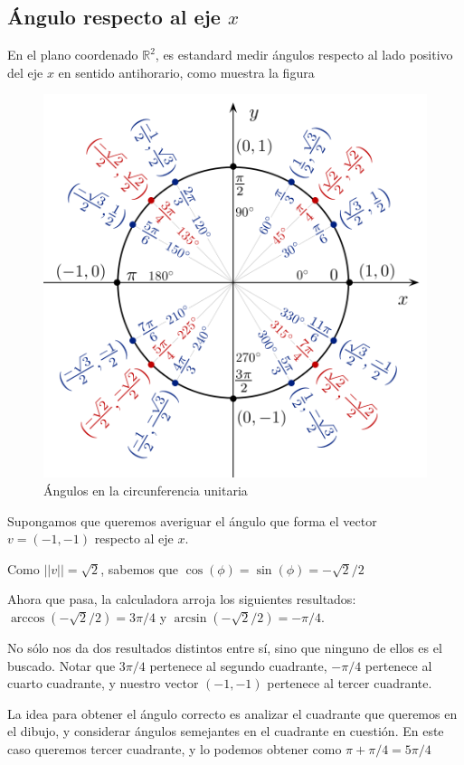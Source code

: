 \subsection{Ángulo respecto al eje $x$}

En el plano coordenado $\mathbb{R}^2$, es estandard medir ángulos respecto al lado positivo del eje $x$ en sentido antihorario, como muestra la figura

\begin{figure}[h]
\centering\includegraphics[scale=0.5]{images/01_precalculo/unit_circle_angles_color.png}
\caption{Ángulos en la circunferencia unitaria}
\end{figure}

Supongamos que queremos averiguar el ángulo que forma el vector $v = (-1,-1)$ respecto al eje $x$.  

Como $||v|| = \sqrt{2}$, sabemos que $\cos(\phi) = \sin(\phi) = - \sqrt{2}/2$

Ahora que pasa, la calculadora arroja los siguientes resultados: $\arccos(-\sqrt{2}/2) = 3 \pi/4 $ y $\arcsin(- \sqrt{2}/2) = - \pi / 4$.  

No sólo nos da dos resultados distintos entre sí, sino que ninguno de ellos es el buscado.  Notar que $3\pi/4$ pertenece al segundo cuadrante, $- \pi/4$ pertenece al cuarto cuadrante, y nuestro vector $(-1,-1)$ pertenece al tercer cuadrante.

La idea para obtener el ángulo correcto es analizar el cuadrante que queremos en el dibujo, y considerar ángulos semejantes en el cuadrante en cuestión.  En este caso queremos tercer cuadrante, y lo podemos obtener como $\pi + \pi/4 = 5\pi/4$

